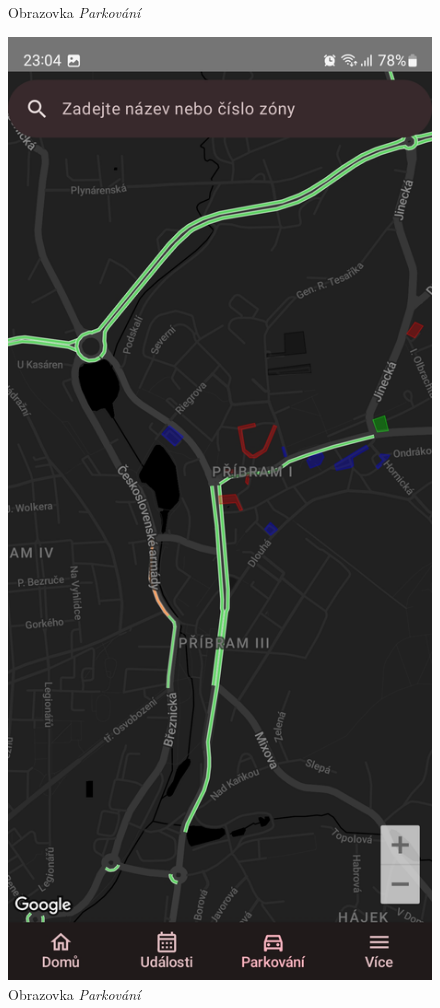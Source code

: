 \begin{figure}[H]
  \caption{Obrazovka \textit{Parkování}}
\endminipage\hfill
{}
  \includegraphics[width=\linewidth]{screens/3a_B.jpg}
  \caption{Obrazovka \textit{Parkování}}
\endminipage\hfill
\end{figure}


